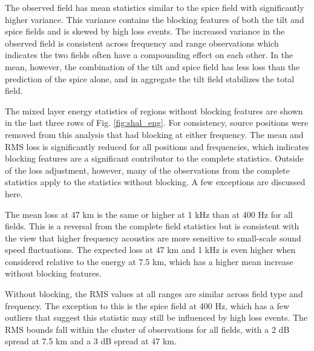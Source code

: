 \documentclass[preprint,NumberedRefs]{JASA}
\begin{document}
The observed field has mean statistics similar to the spice field with significantly higher variance. This variance contains the blocking features of both the tilt and spice fields and is skewed by high loss events. The increased variance in the observed field is consistent across frequency and range observations which indicates the two fields often have a compounding effect on each other. In the mean, however, the combination of the tilt and spice field has less loss than the prediction of the spice alone, and in aggregate the tilt field stabilizes the total field.

The mixed layer energy statistics of regions without blocking features are shown in the last three rows of Fig. \ref{fig:shal_eng}. For consistency, source positions were removed from this analysis that had blocking at either frequency. The mean and RMS loss is significantly reduced for all positions and frequencies, which indicates blocking features are a significant contributor to the complete statistics. Outside of the loss adjustment, however, many of the observations from the complete statistics apply to the statistics without blocking. A few exceptions are discussed here.

The mean loss at 47 km is the same or higher at 1 kHz than at 400 Hz for all fields. This is a reversal from the complete field statistics but is consistent with the view that higher frequency acoustics are more sensitive to small-scale sound speed fluctuations. The expected loss at 47 km and 1 kHz is even higher when considered relative to the energy at 7.5 km, which has a higher mean increase without blocking features.

Without blocking, the RMS values at all ranges are similar across field type and frequency. The exception to this is the spice field at 400 Hz, which has a few outliers that suggest this statistic may still be influenced by high loss events. The RMS bounds fall within the cluster of observations for all fields, with a 2 dB spread at 7.5 km and a 3 dB spread at 47 km.
\end{document}
